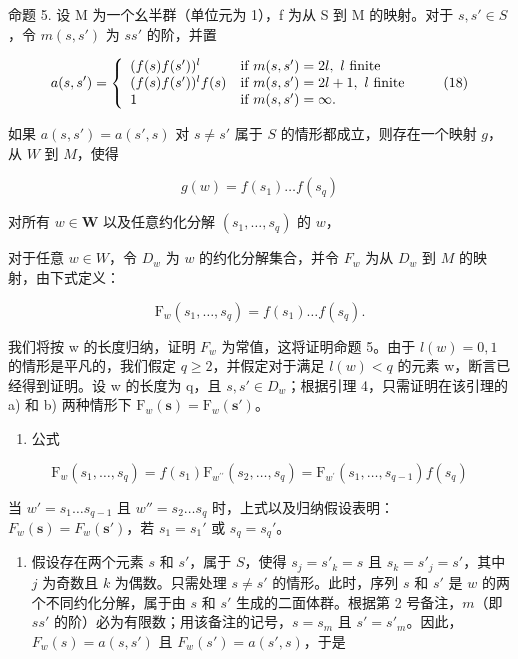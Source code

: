 命题 5. 设 M 为一个幺半群（单位元为 1），f 为从 S 到 M 的映射。对于 \(s, s' \in S\)，令 \(m(s, s')\) 为 \(ss'\) 的阶，并置

\[
a (s, s ^ {\prime}) = \left\{ \begin{array}{l l} (f (s) f (s ^ {\prime})) ^ {l} & \text {if } m(s,s^{\prime}) = 2l,\ l \text { finite} \\ (f (s) f (s ^ {\prime})) ^ {l} f (s) & \text {if } m(s,s^{\prime}) = 2l + 1,\ l \text { finite} \\ 1 & \text {if } m(s,s^{\prime}) = \infty . \end{array} \right.\tag{18}
\]

如果 \(a(s, s') = a(s', s)\) 对 \(s \neq s'\) 属于 \(S\) 的情形都成立，则存在一个映射 \(g\)，从 \(W\) 到 \(M\)，使得

\[
g (w) = f \left(s _ {1}\right) \dots f \left(s _ {q}\right)\tag{19}
\]

对所有 \(w \in \mathbf{W}\) 以及任意约化分解 \((s_1, \ldots, s_q)\) 的 \(w\)，

对于任意 \(w \in W\)，令 \(D_w\) 为 \(w\) 的约化分解集合，并令 \(F_w\) 为从 \(D_w\) 到 \(M\) 的映射，由下式定义：

\[
\mathrm{F} _ {w} (s _ {1}, \dots , s _ {q}) = f (s _ {1}) \dots f (s _ {q}).
\]

我们将按 w 的长度归纳，证明 \(F_{w}\) 为常值，这将证明命题 5。由于 \(l(w) = 0, 1\) 的情形是平凡的，我们假定 \(q \geqslant 2\)，并假定对于满足 \(l(w) < q\) 的元素 w，断言已经得到证明。设 w 的长度为 q，且 \(s, s' \in D_w\)；根据引理 4，只需证明在该引理的 a) 和 b) 两种情形下 \(\mathrm{F}_{w}(\mathbf{s}) = \mathrm{F}_{w}(\mathbf{s}')\)。

\begin{enumerate}
\def\labelenumi{\alph{enumi})}
\tightlist
\item
  公式
\end{enumerate}

\[
\mathrm{F} _ {w} \left(s _ {1}, \dots , s _ {q}\right) = f \left(s _ {1}\right) \mathrm{F} _ {w ^ {\prime \prime}} \left(s _ {2}, \dots , s _ {q}\right) = \mathrm{F} _ {w ^ {\prime}} \left(s _ {1}, \dots , s _ {q - 1}\right) f \left(s _ {q}\right)
\]

当 \(w' = s_1 \ldots s_{q-1}\) 且 \(w'' = s_2 \ldots s_q\) 时，上式以及归纳假设表明：\(F_w(\mathbf{s}) = F_w(\mathbf{s}')\)，若 \(s_1 = s_1'\) 或 \(s_q = s_q'\)。

\begin{enumerate}
\def\labelenumi{\alph{enumi})}
\setcounter{enumi}{1}
\tightlist
\item
  假设存在两个元素 \(s\) 和 \(s'\)，属于 \(S\)，使得 \(s_j = s'_k = s\) 且 \(s_k = s'_j = s'\)，其中 \(j\) 为奇数且 \(k\) 为偶数。只需处理 \(s \neq s'\) 的情形。此时，序列 \(s\) 和 \(s'\) 是 \(w\) 的两个不同约化分解，属于由 \(s\) 和 \(s'\) 生成的二面体群。根据第 2 号备注，\(m\)（即 \(ss'\) 的阶）必为有限数；用该备注的记号，\(s = s_m\) 且 \(s' = s'_m\)。因此，\(F_w(s) = a(s, s')\) 且 \(F_w(s') = a(s', s)\)，于是
\end{enumerate}

